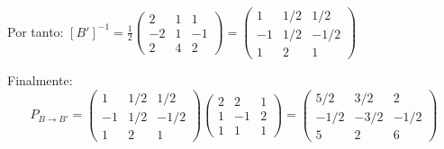 \begin{prob}
\begin{myproof}
Por tanto: $[B']^{-1} = \frac{1}{2}\begin{pmatrix}2&1&1\\-2&1&-1\\2&4&2\end{pmatrix} = \begin{pmatrix}1&1/2&1/2\\-1&1/2&-1/2\\1&2&1\end{pmatrix}$

Finalmente:
$$P_{B\to B'} = \begin{pmatrix}1&1/2&1/2\\-1&1/2&-1/2\\1&2&1\end{pmatrix}\begin{pmatrix}2&2&1\\1&-1&2\\1&1&1\end{pmatrix} = \begin{pmatrix}5/2&3/2&2\\-1/2&-3/2&-1/2\\5&2&6\end{pmatrix}$$
\end{myproof}
\end{prob}

